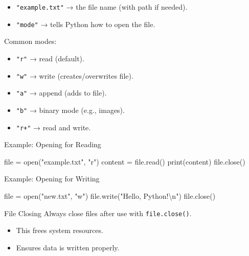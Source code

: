 \documentclass[
  letterpaper,
  DIV=11,
  numbers=noendperiod]{scrreprt}
\newenvironment{Shaded}{\begin{snugshade}}{\end{snugshade}}
\newcommand{\BuiltInTok}[1]{\textcolor[rgb]{0.00,0.23,0.31}{#1}}
\newcommand{\CharTok}[1]{\textcolor[rgb]{0.13,0.47,0.30}{#1}}
\newcommand{\NormalTok}[1]{\textcolor[rgb]{0.00,0.23,0.31}{#1}}
\newcommand{\OperatorTok}[1]{\textcolor[rgb]{0.37,0.37,0.37}{#1}}
\newcommand{\StringTok}[1]{\textcolor[rgb]{0.13,0.47,0.30}{#1}}
\providecommand{\tightlist}{%
  \setlength{\itemsep}{0pt}\setlength{\parskip}{0pt}}
\begin{document}
\begin{itemize}
\tightlist
\item
  \texttt{"example.txt"} → the file name (with path if needed).
\item
  \texttt{"mode"} → tells Python how to open the file.
\end{itemize}

Common modes:

\begin{itemize}
\tightlist
\item
  \texttt{"r"} → read (default).
\item
  \texttt{"w"} → write (creates/overwrites file).
\item
  \texttt{"a"} → append (adds to file).
\item
  \texttt{"b"} → binary mode (e.g., images).
\item
  \texttt{"r+"} → read and write.
\end{itemize}

Example: Opening for Reading

\begin{Shaded}
\begin{Highlighting}[]
\BuiltInTok{file} \OperatorTok{=} \BuiltInTok{open}\NormalTok{(}\StringTok{"example.txt"}\NormalTok{, }\StringTok{"r"}\NormalTok{)}
\NormalTok{content }\OperatorTok{=} \BuiltInTok{file}\NormalTok{.read()}
\BuiltInTok{print}\NormalTok{(content)}
\BuiltInTok{file}\NormalTok{.close()}
\end{Highlighting}
\end{Shaded}

Example: Opening for Writing

\begin{Shaded}
\begin{Highlighting}[]
\BuiltInTok{file} \OperatorTok{=} \BuiltInTok{open}\NormalTok{(}\StringTok{"new.txt"}\NormalTok{, }\StringTok{"w"}\NormalTok{)}
\BuiltInTok{file}\NormalTok{.write(}\StringTok{"Hello, Python!}\CharTok{\textbackslash{}n}\StringTok{"}\NormalTok{)}
\BuiltInTok{file}\NormalTok{.close()}
\end{Highlighting}
\end{Shaded}

File Closing Always close files after use with \texttt{file.close()}.

\begin{itemize}
\tightlist
\item
  This frees system resources.
\item
  Ensures data is written properly.
\end{itemize}
\end{document}
